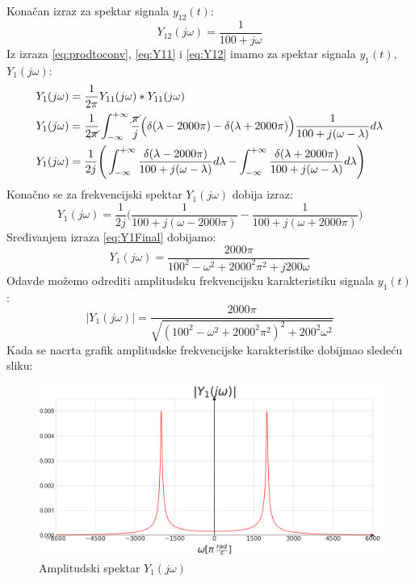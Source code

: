 \documentclass[titlepage,a4paper,12pt]{article}
\begin{document}
	Konačan izraz za spektar signala $y_{12}(t)$:
	\begin{equation}
			Y_{12}(j\omega) =\frac{1}{100+j\omega }\label{eq:Y12}
	\end{equation}
	Iz izraza \eqref{eq:prodtoconv}, \eqref{eq:Y11} i \eqref{eq:Y12} imamo za spektar signala $y_1(t)$, $Y_1(j\omega)$:
	\begin{align*}
		Y_1(j\omega) &= \frac{1}{2\pi}Y_{11}(j\omega)*Y_{11}(j\omega)\\
		Y_1(j\omega) &= \frac{1}{2\cancel{\pi}}\int_{-\infty}^{+\infty}
		\frac{\cancel{\pi}}{j} \Big(
		\delta(\lambda-2000\pi) - \delta(\lambda+2000\pi)\Big)
		\frac{1}{100+j(\omega-\lambda)}d\lambda\\
		Y_1(j\omega) &= \frac{1}{2j}\Bigg(\int_{-\infty}^{+\infty}
		\frac{\delta(\lambda-2000\pi)}{100+j(\omega-\lambda)}d\lambda
		-\int_{-\infty}^{+\infty}
		\frac{\delta(\lambda+2000\pi)}{100+j(\omega-\lambda)}d\lambda
		\Bigg)
	\end{align*}
	Konačno se za frekvencijski spektar $Y_1(j\omega)$ dobija izraz:
	\begin{equation}
		Y_1(j\omega) = \frac{1}{2j}\Bigg(
		\frac{1}{100+j(\omega-2000\pi)} -
		\frac{1}{100+j(\omega+2000\pi)}
		\Bigg)\label{eq:Y1Final}
	\end{equation}
	Sređivanjem izraza \eqref{eq:Y1Final} dobijamo:
	\begin{equation*}
		Y_1(j\omega) = \frac{2000\pi}{100^2-\omega^2+2000^2\pi^2+j200\omega}
	\end{equation*}
	Odavde možemo odrediti amplitudsku frekvencijsku karakteristiku signala $y_1(t)$:
	\begin{equation}
		|Y_1(j\omega)| = \frac{2000\pi}{\sqrt{(100^2-\omega^2+2000^2\pi^2)^2+200^2\omega^2}}
	\end{equation}
	\clearpage
	Kada se nacrta grafik amplitudske frekvencijske karakteristike dobijmao sledeću sliku:
	\begin{figure}[ht]
		\centering
		\includegraphics[width=\textwidth]{Images/AmpY1.png}
		\caption{Amplitudski spektar $Y_1(j\omega)$}\label{fig:AmpY1}
	\end{figure}
	\FloatBarrier
	\clearpage
\end{document}
